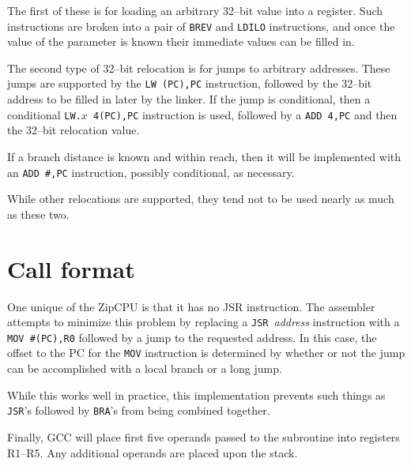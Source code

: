 \documentclass{gqtekspec}
\begin{document}
The first of these is for loading an arbitrary 32--bit value into a register. 
Such instructions are broken into a pair of {\tt BREV} and {\tt LDILO}
instructions, and once the value of the parameter is known their immediate
values can be filled in.

The second type of 32--bit relocation is for jumps to arbitrary addresses.
These jumps are supported by the \hbox{\tt LW (PC),PC} instruction, followed
by the 32--bit address to be filled in later by the linker.  If the jump is
conditional, then a conditional \hbox{\tt LW.$x$ 4(PC),PC} instruction is
used, followed by a {\tt ADD 4,PC} and then the 32--bit relocation value.

If a branch distance is known and within reach, then it will be implemented
with an {\tt ADD \#,PC} instruction, possibly conditional, as necessary.

While other relocations are supported, they tend not to be used nearly as much
as these two.

\section{Call format}\label{sec:abi-jsr}

One unique of the ZipCPU is that it has no JSR instruction.  The assembler
attempts to minimize this problem by replacing a {\tt JSR}~{\em address}
instruction with a {\tt MOV \#(PC),R0} followed by a jump to the requested
address.  In this case, the offset to the PC for the {\tt MOV} instruction
is determined by whether or not the jump can be accomplished with a local
branch or a long jump.

While this works well in practice, this implementation prevents such things
as {\tt JSR}'s followed by {\tt BRA}'s from being combined together.

Finally, GCC will place first five operands passed to the subroutine into
registers R1--R5.  Any additional operands are placed upon the stack.
\end{document}
